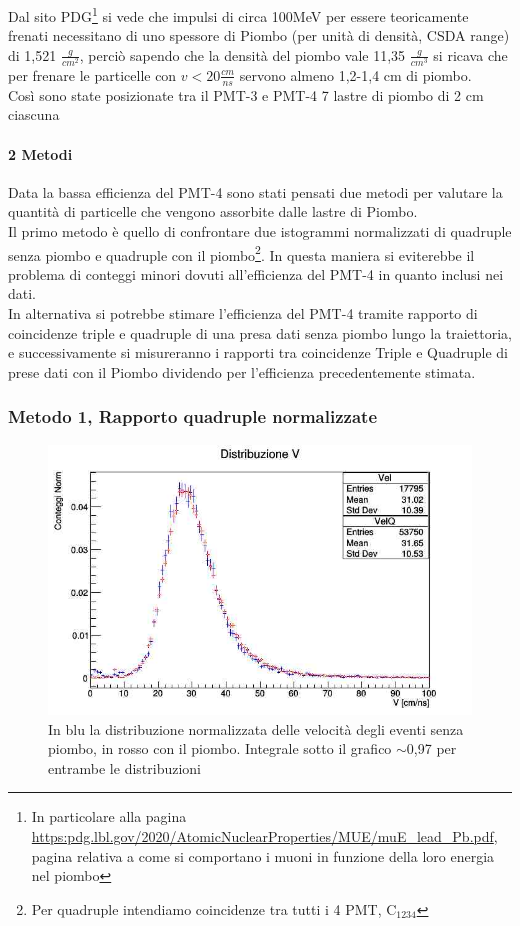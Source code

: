 \documentclass[a4paper]{article}
\begin{document}
Dal sito PDG\footnote{In particolare alla pagina \url{https:pdg.lbl.gov/2020/AtomicNuclearProperties/MUE/muE_lead_Pb.pdf}, pagina relativa a come si comportano i muoni in funzione della loro energia nel piombo} si vede che impulsi di circa 100MeV per essere teoricamente frenati necessitano di uno spessore di Piombo (per unità di densità, CSDA range) di 1,521 $\frac{g}{cm^2}$, perciò sapendo che la densità del piombo vale 11,35 $\frac{g}{cm^3}$ si ricava che per frenare le particelle con $v<20\frac{cm}{ns}$ servono almeno 1,2-1,4 cm di piombo.\\
Così sono state posizionate tra il PMT-3 e PMT-4 7 lastre di piombo di 2 cm ciascuna

\paragraph{2 Metodi}
Data la bassa efficienza del PMT-4 sono stati pensati due metodi per valutare la quantità di particelle che vengono assorbite dalle lastre di Piombo.\\
Il primo metodo è quello di confrontare due istogrammi normalizzati di quadruple senza piombo e quadruple con il piombo\footnote{Per quadruple intendiamo coincidenze tra tutti i 4 PMT, C$_{1234}$}. In questa maniera si eviterebbe il problema di conteggi minori dovuti all'efficienza del PMT-4 in quanto inclusi nei dati.\\
In alternativa si potrebbe stimare l'efficienza del PMT-4 tramite rapporto di coincidenze triple e quadruple di una presa dati senza piombo lungo la traiettoria, e successivamente si misureranno i rapporti tra coincidenze Triple e Quadruple di prese dati con il Piombo dividendo per l'efficienza precedentemente stimata.

\subsubsection*{Metodo 1, Rapporto quadruple normalizzate}

\begin{figure}[H]
\centering
\includegraphics[scale=0.3]{./immagini/TimeOfFlight/VNormForeQuadruple.jpg}
\caption{In blu la distribuzione normalizzata delle velocità degli eventi senza piombo, in rosso con il piombo. Integrale sotto il grafico $\sim$0,97 per entrambe le distribuzioni}
\label{fig:VNormFore}
\end{figure}
\end{document}
